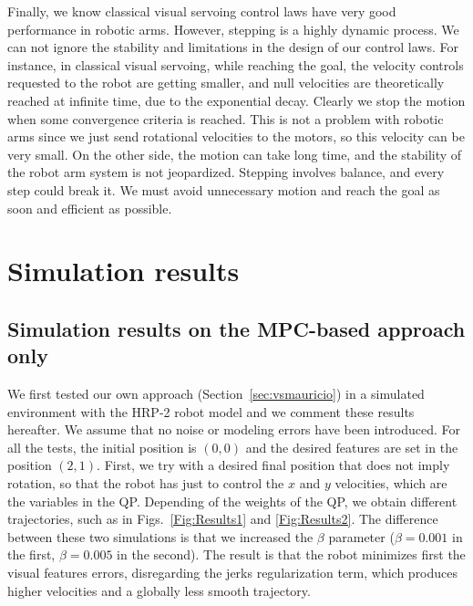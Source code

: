 Finally, we know classical visual servoing control laws have very good performance in robotic arms. However, stepping is a highly dynamic process. We can not ignore the stability and limitations in the design of our control laws. For instance, in classical visual servoing, while reaching the goal, the velocity controls requested to the robot are getting smaller, and null velocities are theoretically reached at infinite time, due to the exponential decay. Clearly we stop the motion when some convergence criteria is reached. This is not a problem with robotic arms since we just send rotational velocities to the motors, so this velocity can be very small. On the other side, the motion can take long time, and the stability of the robot arm system is not jeopardized. Stepping involves balance, and every step could break it. We must avoid unnecessary motion and reach the goal as soon and efficient as possible.


\section{Simulation results}

\subsection{Simulation results on the MPC-based approach only}

We first tested our own approach (Section~\ref{sec:vsmauricio}) in a simulated environment with the HRP-2 robot model and we comment these results hereafter. We assume that no noise or modeling errors have been introduced. For all the tests, the initial position is $(0,0)$ and the desired features are set in the position $(2,1)$. First, we try with a desired final position that does not imply rotation, so that the robot has just to control the $x$ and $y$ velocities, which are the variables in the QP. Depending of the weights of the QP, we obtain different trajectories, such as in Figs.~\ref{Fig:Results1} and \ref{Fig:Results2}. The difference between these two simulations is that we increased the $\beta $ parameter ($\beta=0.001$ in the first, $\beta =0.005$ in the second). The result is that the robot minimizes first the visual features errors, disregarding the jerks regularization term, which produces higher velocities and a globally less smooth trajectory.


